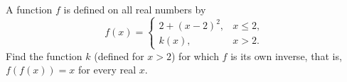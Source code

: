 A function $f$ is defined on all real numbers by
\[
f(x)=\begin{cases}2+(x-2)^2, & x\le2,\\ k(x), & x>2.\end{cases}
\]
Find the function $k$ (defined for $x>2$) for which $f$ is its own inverse, that is, $f(f(x))=x$ for every real $x$.
